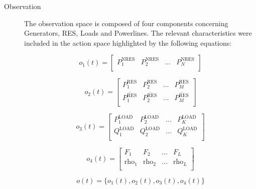 \begin{description}
	\item[Observation] The observation space is composed of four components concerning Generators, \ac{RES}, Loads and Powerlines. The relevant characteristics were included in the action space highlighted by the following equations:
	
	\begin{equation} \label{eq:simple-obs-space1}
		o_{1}(t)= \begin{bmatrix}
			P^\text{NRES}_1 & P^\text{NRES}_2 & \dots & P^\text{NRES}_{N} \\
		\end{bmatrix}
	\end{equation}
	
	\begin{equation} \label{eq:simple-obs-space2}
		o_{2}(t)= \begin{bmatrix}
			P^\text{RES}_1 & P^\text{RES}_2 & \dots & P^\text{RES}_{M} \\
			\overline{P^\text{RES}_1} & \overline{P^\text{RES}_2} & \dots & \overline{P^\text{RES}_{M}} \\
		\end{bmatrix}
	\end{equation}
	
	\begin{equation} \label{eq:simple-obs-space3}
		o_{3}(t)= \begin{bmatrix}
			P^\text{LOAD}_1 & P^\text{LOAD}_2 & \dots & P^\text{LOAD}_{K} \\
			Q^\text{LOAD}_1 & Q^\text{LOAD}_2 & \dots & Q^\text{LOAD}_{K} \\
		\end{bmatrix}
	\end{equation}
	
	\begin{equation} \label{eq:simple-obs-space4}
		o_{4}(t)= \begin{bmatrix}
			F_1 & F_2 & \dots & F_{L} \\
			\text{rho}_1 & \text{rho}_2 & \dots & \text{rho}_{L} \\
		\end{bmatrix}
	\end{equation}
	
	\begin{equation} \label{eq:simple-obs-space}
		o(t)= \{ o_{1}(t), o_{2}(t), o_{3}(t), o_{4}(t) \}
	\end{equation}
	

\end{description}
